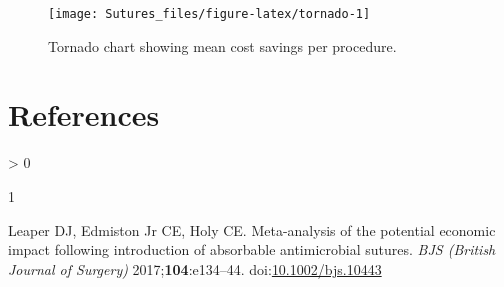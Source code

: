 \documentclass[
]{article}
\newlength{\cslhangindent}
\newlength{\csllabelwidth}
\newenvironment{CSLReferences}[2] %
 {%
  \setlength{\parindent}{0pt}
  \ifodd #1 \everypar{\setlength{\hangindent}{\cslhangindent}}\ignorespaces\fi
  \ifnum #2 > 0
  \setlength{\parskip}{#2\baselineskip}
  \fi
 }%
 {}
\newcommand{\CSLLeftMargin}[1]{\parbox[t]{\csllabelwidth}{#1}}
\newcommand{\CSLRightInline}[1]{\parbox[t]{\linewidth - \csllabelwidth}{#1}\break}
\begin{document}
\begin{figure}

{\centering \texttt{[image: Sutures\_files/figure-latex/tornado-1]} 

}

\caption{Tornado chart showing mean cost savings per procedure.}\label{fig:tornado}
\end{figure}

\hypertarget{references}{%
\section*{References}\label{references}}

\hypertarget{refs}{}
\begin{CSLReferences}{0}{0}
\leavevmode\hypertarget{ref-leaper2017}{}%
\CSLLeftMargin{1 }
\CSLRightInline{Leaper DJ, Edmiston Jr CE, Holy CE. Meta-analysis of the
potential economic impact following introduction of absorbable
antimicrobial sutures. \emph{{BJS} (British Journal of Surgery)}
2017;\textbf{104}:e134--44.
doi:\href{https://doi.org/10.1002/bjs.10443}{10.1002/bjs.10443}}

\end{CSLReferences}
\end{document}
